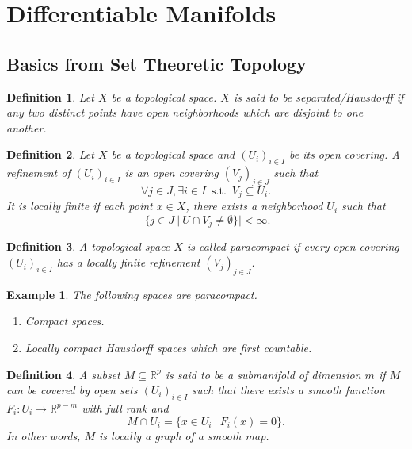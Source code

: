 \documentclass[10pt]{article}
\newtheorem{definition}{Definition}[section]
\newtheorem{example}{Example}[section]
\DeclareMathOperator{\straw}{s.t.}
\newcommand{\R}[0]{\mathbb{R}}
\newcommand{\st}[0]{\:\straw\:}
\begin{document}
\section{Differentiable Manifolds}
\subsection{Basics from Set Theoretic Topology}
\begin{definition}
Let $X$ be a topological space. $X$ is said to be separated/Hausdorff if any two distinct points have open neighborhoods which are disjoint to one another. 
\end{definition}

\begin{definition}
Let $X$ be a topological space and $(U_i)_{i\in I}$ be its open covering. A refinement of $(U_i)_{i\in I}$ is an open covering $(V_j)_{j\in J}$ such that 
\begin{equation*}
\forall j\in J,\exists i\in I\st V_j\subseteq U_i.
\end{equation*}
It is locally finite if each point $x\in X$, there exists a neighborhood $U_i$ such that 
\begin{equation*}
\vert\{ j\in J\:|\: U\cap V_j\not=\emptyset\}\vert <\infty.
\end{equation*} 
\end{definition}

\begin{definition}
A topological space $X$ is called paracompact if every open covering $(U_i)_{i\in I}$ has a locally finite refinement $(V_j)_{j\in J}$. 
\end{definition}

\begin{example}The following spaces are paracompact.
\begin{enumerate}[1).]
\item Compact spaces.
\item Locally compact Hausdorff spaces which are first countable.
\end{enumerate}
\end{example}

\begin{definition}
A subset $M\subseteq\R^p$ is said to be a submanifold of dimension $m$ if $M$ can be covered by open sets $(U_i)_{i\in I}$ such that there exists a smooth function $F_i:U_i\to\R^{p-m}$ with full rank and 
\begin{equation*}
M\cap U_i=\{x\in U_i\:|\: F_i(x)=0\}.
\end{equation*}
In other words, $M$ is locally a graph of a smooth map.
\end{definition}
\end{document}
